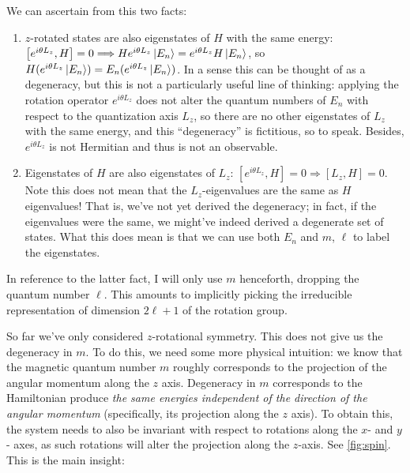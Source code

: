 \documentclass{report}
\begin{document}
We can ascertain from this two facts: 
\begin{enumerate}[]
\item $ z $-rotated states are also eigenstates of $ H $ with the same 
	energy: $ \left[ e^{ i\theta L_z }, H \right] = 0 \Longrightarrow H e^{i\theta
	L_z}\ket{E_n} = e^{i\theta L_z} H\ket{E_n} $, so $H (e^{i\theta
	L_z}\ket{E_n}) = E_n (e^{i\theta L_z}\ket{E_n})$. In a sense this can 
	be thought of as a degeneracy, but this is not a particularly useful line of
	thinking: applying the rotation operator $ e^{i\theta L_z} $ does not alter
	the quantum numbers of $ E_n $ with respect to the quantization axis $ L_z$,
	so there are no other eigenstates of $ L_z $ with the same energy, and 
	this ``degeneracy'' is fictitious, so to speak. Besides, $ e^{i\theta L_z} $
	is not Hermitian and thus is not an observable.
\item Eigenstates of $ H $ are also eigenstates of $ L_z $: 
	$  \left[ e^{ i\theta L_z }, H \right] = 0 \Longrightarrow \left[ L_z, H \right]=0$.
	Note this does not mean that the $ L_z $-eigenvalues are the same as $ H $
	eigenvalues! That is, we've not yet derived the degeneracy; in fact, 
	if the eigenvalues were the same, we might've indeed derived a degenerate set 
	of states. What this does mean is that we can use both $ E_n $ and $ m $, $
	\ell $ to label the eigenstates.
\end{enumerate}
In reference to the latter fact, I will only use $ m $ henceforth, dropping the 
quantum number $ \ell $. This amounts to implicitly picking the irreducible 
representation of dimension $ 2\ell + 1 $ of the rotation group. 

So far we've only considered $ z $-rotational symmetry. This does not give us 
the degeneracy in $ m $. To do this, we need some more physical intuition: 
we know that the magnetic quantum number $ m $ roughly corresponds to the 
projection of the angular momentum along the $ z $ axis. Degeneracy in $ m $
corresponds to the Hamiltonian produce \textit{the same energies independent of
the direction of the angular momentum} (specifically, its projection along the 
$ z $ axis). To obtain this, the system needs to also be invariant with respect 
to rotations along the $ x $- and $ y $- axes, as such rotations will alter 
the projection along the $ z $-axis. See \cref{fig:spin}. This is the main insight: 
\end{document}
